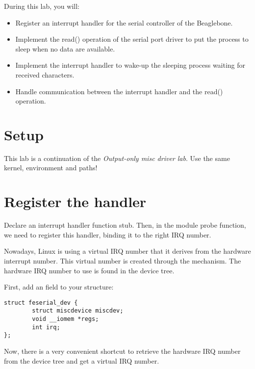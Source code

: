 
During this lab, you will:

\begin{itemize}
\item Register an interrupt handler for the serial controller of the
  Beaglebone.
\item Implement the read() operation of the serial port driver to put
  the process to sleep when no data are available.
\item Implement the interrupt handler to wake-up the sleeping process
  waiting for received characters.
\item Handle communication between the interrupt handler and the
  read() operation.
\end{itemize}

\section{Setup}

This lab is a continuation of the {\em Output-only misc driver
lab}. Use the same kernel, environment and paths!

\section{Register the handler}

Declare an interrupt handler function stub. Then, in the module probe
function, we need to register this handler, binding it to the right
IRQ number.

Nowadays, Linux is using a virtual IRQ number that it derives from the
hardware interrupt number. This virtual number is created through the
 mechanism. The hardware IRQ number to use is found in
the device tree.

First, add an  field to your  structure:

\begin{verbatim}
struct feserial_dev {
        struct miscdevice miscdev;
        void __iomem *regs;
        int irq;
};
\end{verbatim}

Now, there is a very convenient shortcut to retrieve the
hardware IRQ number from the device tree and get a virtual IRQ number.

